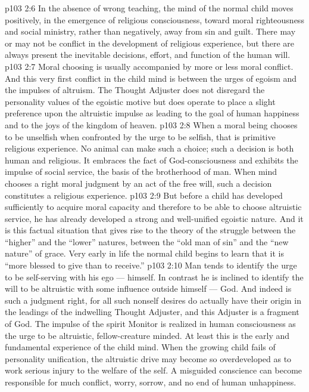 \vs p103 2:6 In the absence of wrong teaching, the mind of the normal child moves positively, in the emergence of religious consciousness, toward moral righteousness and social ministry, rather than negatively, away from sin and guilt. There may or may not be conflict in the development of religious experience, but there are always present the inevitable decisions, effort, and function of the human will.
\vs p103 2:7 Moral choosing is usually accompanied by more or less moral conflict. And this very first conflict in the child mind is between the urges of egoism and the impulses of altruism. The Thought Adjuster does not disregard the personality values of the egoistic motive but does operate to place a slight preference upon the altruistic impulse as leading to the goal of human happiness and to the joys of the kingdom of heaven.
\vs p103 2:8 When a moral being chooses to be unselfish when confronted by the urge to be selfish, that is primitive religious experience. No animal can make such a choice; such a decision is both human and religious. It embraces the fact of God\hyp{}consciousness and exhibits the impulse of social service, the basis of the brotherhood of man. When mind chooses a right moral judgment by an act of the free will, such a decision constitutes a religious experience.
\vs p103 2:9 But before a child has developed sufficiently to acquire moral capacity and therefore to be able to choose altruistic service, he has already developed a strong and well\hyp{}unified egoistic nature. And it is this factual situation that gives rise to the theory of the struggle between the “higher” and the “lower” natures, between the “old man of sin” and the “new nature” of grace. Very early in life the normal child begins to learn that it is “more blessed to give than to receive.”
\vs p103 2:10 Man tends to identify the urge to be self\hyp{}serving with his ego --- himself. In contrast he is inclined to identify the will to be altruistic with some influence outside himself --- God. And indeed is such a judgment right, for all such nonself desires do actually have their origin in the leadings of the indwelling Thought Adjuster, and this Adjuster is a fragment of God. The impulse of the spirit Monitor is realized in human consciousness as the urge to be altruistic, fellow\hyp{}creature minded. At least this is the early and fundamental experience of the child mind. When the growing child fails of personality unification, the altruistic drive may become so overdeveloped as to work serious injury to the welfare of the self. A misguided conscience can become responsible for much conflict, worry, sorrow, and no end of human unhappiness.
